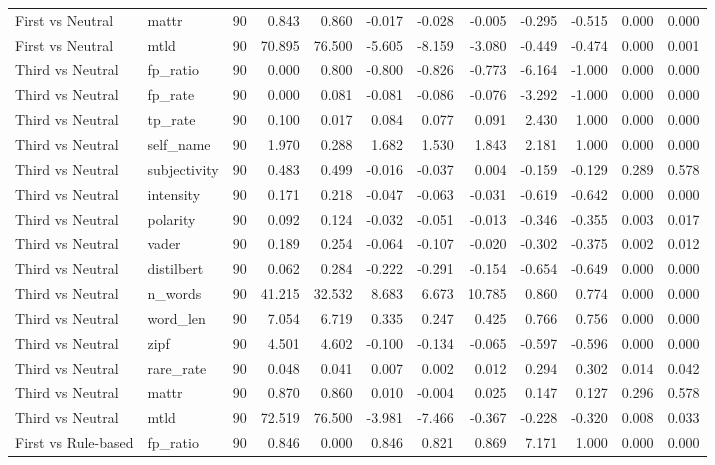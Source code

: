 \documentclass[10pt]{article}
\begin{document}
{\begin{longtable}{llrrrrrrrrrr}
First vs Neutral & mattr & 90 & 0.843 & 0.860 & -0.017 & -0.028 & -0.005 & -0.295 & -0.515 & 0.000 & 0.000 \\
First vs Neutral & mtld & 90 & 70.895 & 76.500 & -5.605 & -8.159 & -3.080 & -0.449 & -0.474 & 0.000 & 0.001 \\
Third vs Neutral & fp\_ratio & 90 & 0.000 & 0.800 & -0.800 & -0.826 & -0.773 & -6.164 & -1.000 & 0.000 & 0.000 \\
Third vs Neutral & fp\_rate & 90 & 0.000 & 0.081 & -0.081 & -0.086 & -0.076 & -3.292 & -1.000 & 0.000 & 0.000 \\
Third vs Neutral & tp\_rate & 90 & 0.100 & 0.017 & 0.084 & 0.077 & 0.091 & 2.430 & 1.000 & 0.000 & 0.000 \\
Third vs Neutral & self\_name & 90 & 1.970 & 0.288 & 1.682 & 1.530 & 1.843 & 2.181 & 1.000 & 0.000 & 0.000 \\
Third vs Neutral & subjectivity & 90 & 0.483 & 0.499 & -0.016 & -0.037 & 0.004 & -0.159 & -0.129 & 0.289 & 0.578 \\
Third vs Neutral & intensity & 90 & 0.171 & 0.218 & -0.047 & -0.063 & -0.031 & -0.619 & -0.642 & 0.000 & 0.000 \\
Third vs Neutral & polarity & 90 & 0.092 & 0.124 & -0.032 & -0.051 & -0.013 & -0.346 & -0.355 & 0.003 & 0.017 \\
Third vs Neutral & vader & 90 & 0.189 & 0.254 & -0.064 & -0.107 & -0.020 & -0.302 & -0.375 & 0.002 & 0.012 \\
Third vs Neutral & distilbert & 90 & 0.062 & 0.284 & -0.222 & -0.291 & -0.154 & -0.654 & -0.649 & 0.000 & 0.000 \\
Third vs Neutral & n\_words & 90 & 41.215 & 32.532 & 8.683 & 6.673 & 10.785 & 0.860 & 0.774 & 0.000 & 0.000 \\
Third vs Neutral & word\_len & 90 & 7.054 & 6.719 & 0.335 & 0.247 & 0.425 & 0.766 & 0.756 & 0.000 & 0.000 \\
Third vs Neutral & zipf & 90 & 4.501 & 4.602 & -0.100 & -0.134 & -0.065 & -0.597 & -0.596 & 0.000 & 0.000 \\
Third vs Neutral & rare\_rate & 90 & 0.048 & 0.041 & 0.007 & 0.002 & 0.012 & 0.294 & 0.302 & 0.014 & 0.042 \\
Third vs Neutral & mattr & 90 & 0.870 & 0.860 & 0.010 & -0.004 & 0.025 & 0.147 & 0.127 & 0.296 & 0.578 \\
Third vs Neutral & mtld & 90 & 72.519 & 76.500 & -3.981 & -7.466 & -0.367 & -0.228 & -0.320 & 0.008 & 0.033 \\
First vs Rule-based & fp\_ratio & 90 & 0.846 & 0.000 & 0.846 & 0.821 & 0.869 & 7.171 & 1.000 & 0.000 & 0.000 \\

\end{longtable}}
\end{document}

